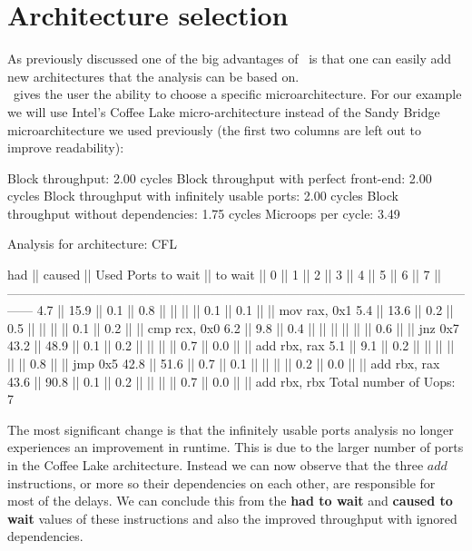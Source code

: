\FloatBarrier

\section{Architecture selection}

As previously discussed one of the big advantages of \suaca\ is that one can easily add new architectures that the analysis can be based on.\\
\suaca\ gives the user the ability to choose a specific microarchitecture. For our example we will use Intel's Coffee Lake micro-architecture instead of the Sandy Bridge microarchitecture we used previously (the first two columns are left out to improve readability):\\

\begin{example}
Block throughput: 2.00 cycles
Block throughput with perfect front-end: 2.00 cycles
Block throughput with infinitely usable ports: 2.00 cycles
Block throughput without dependencies: 1.75 cycles
Microops per cycle: 3.49

Analysis for architecture: CFL

   had   || caused  ||            Used Ports
 to wait || to wait ||   0   ||   1   ||   2   ||   3   ||   4   ||   5   ||   6   ||   7   ||
------------------------------------------------------------------------------------------------------------------
   4.7   ||  15.9   ||  0.1  ||  0.8  ||       ||       ||       ||  0.1  ||  0.1  ||       || mov rax, 0x1
   5.4   ||  13.6   ||  0.2  ||  0.5  ||       ||       ||       ||  0.1  ||  0.2  ||       || cmp rcx, 0x0
   6.2   ||   9.8   ||  0.4  ||       ||       ||       ||       ||       ||  0.6  ||       || jnz 0x7
  43.2   ||  48.9   ||  0.1  ||  0.2  ||       ||       ||       ||  0.7  ||  0.0  ||       || add rbx, rax
   5.1   ||   9.1   ||  0.2  ||       ||       ||       ||       ||       ||  0.8  ||       || jmp 0x5
  42.8   ||  51.6   ||  0.7  ||  0.1  ||       ||       ||       ||  0.2  ||  0.0  ||       || add rbx, rax
  43.6   ||  90.8   ||  0.1  ||  0.2  ||       ||       ||       ||  0.7  ||  0.0  ||       || add rbx, rbx
Total number of Uops: 7
\end{example}

The most significant change is that the infinitely usable ports analysis no longer experiences an improvement in runtime. This is due to the larger number of ports in the Coffee Lake architecture. Instead we can now observe that the three $add$ instructions, or more so their dependencies on each other, are responsible for most of the delays. We can conclude this from the \textbf{had to wait} and \textbf{caused to wait} values of these instructions and also the improved throughput with ignored dependencies.



